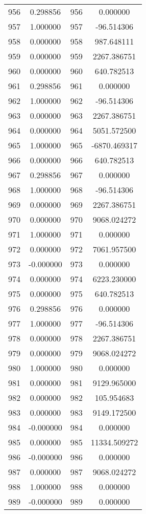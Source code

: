 \documentclass[12pt]{article}
\begin{document}
\begin{longtable}{@{}cccc@{}}
956 & 0.298856 & 956 & 0.000000 \\
957 & 1.000000 & 957 & -96.514306 \\
958 & 0.000000 & 958 & 987.648111 \\
959 & 0.000000 & 959 & 2267.386751 \\
960 & 0.000000 & 960 & 640.782513 \\
961 & 0.298856 & 961 & 0.000000 \\
962 & 1.000000 & 962 & -96.514306 \\
963 & 0.000000 & 963 & 2267.386751 \\
964 & 0.000000 & 964 & 5051.572500 \\
965 & 1.000000 & 965 & -6870.469317 \\
966 & 0.000000 & 966 & 640.782513 \\
967 & 0.298856 & 967 & 0.000000 \\
968 & 1.000000 & 968 & -96.514306 \\
969 & 0.000000 & 969 & 2267.386751 \\
970 & 0.000000 & 970 & 9068.024272 \\
971 & 1.000000 & 971 & 0.000000 \\
972 & 0.000000 & 972 & 7061.957500 \\
973 & -0.000000 & 973 & 0.000000 \\
974 & 0.000000 & 974 & 6223.230000 \\
975 & 0.000000 & 975 & 640.782513 \\
976 & 0.298856 & 976 & 0.000000 \\
977 & 1.000000 & 977 & -96.514306 \\
978 & 0.000000 & 978 & 2267.386751 \\
979 & 0.000000 & 979 & 9068.024272 \\
980 & 1.000000 & 980 & 0.000000 \\
981 & 0.000000 & 981 & 9129.965000 \\
982 & 0.000000 & 982 & 105.954683 \\
983 & 0.000000 & 983 & 9149.172500 \\
984 & -0.000000 & 984 & 0.000000 \\
985 & 0.000000 & 985 & 11334.509272 \\
986 & -0.000000 & 986 & 0.000000 \\
987 & 0.000000 & 987 & 9068.024272 \\
988 & 1.000000 & 988 & 0.000000 \\
989 & -0.000000 & 989 & 0.000000 \\

\end{longtable}
\end{document}

